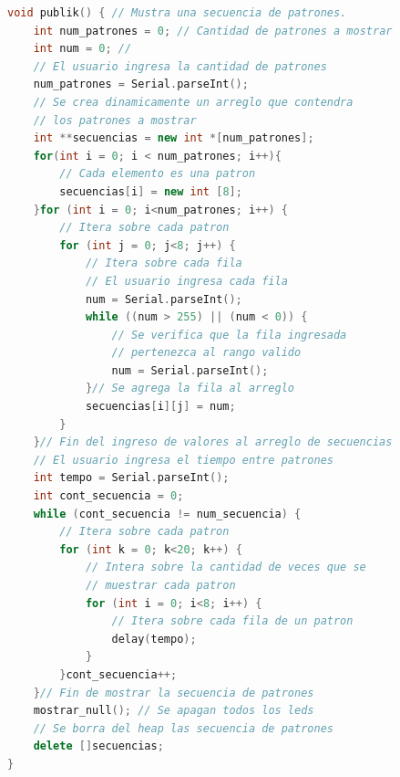 \documentclass{article}
\begin{document}
\begin{lstlisting}[language=C++, label=codigo_ejemplo]
void publik() { // Mustra una secuencia de patrones. 
    int num_patrones = 0; // Cantidad de patrones a mostrar
    int num = 0; // 
    // El usuario ingresa la cantidad de patrones
    num_patrones = Serial.parseInt();
    // Se crea dinamicamente un arreglo que contendra 
    // los patrones a mostrar
    int **secuencias = new int *[num_patrones];
    for(int i = 0; i < num_patrones; i++){
        // Cada elemento es una patron
        secuencias[i] = new int [8];
    }for (int i = 0; i<num_patrones; i++) {
        // Itera sobre cada patron
        for (int j = 0; j<8; j++) {
            // Itera sobre cada fila
            // El usuario ingresa cada fila 
            num = Serial.parseInt();
            while ((num > 255) || (num < 0)) {
                // Se verifica que la fila ingresada 
                // pertenezca al rango valido
                num = Serial.parseInt();
            }// Se agrega la fila al arreglo
            secuencias[i][j] = num;
        }
    }// Fin del ingreso de valores al arreglo de secuencias
    // El usuario ingresa el tiempo entre patrones
    int tempo = Serial.parseInt();
    int cont_secuencia = 0;
    while (cont_secuencia != num_secuencia) {
        // Itera sobre cada patron
        for (int k = 0; k<20; k++) {
            // Intera sobre la cantidad de veces que se 
            // muestrar cada patron 
            for (int i = 0; i<8; i++) {
                // Itera sobre cada fila de un patron
                delay(tempo);
            }
        }cont_secuencia++;
    }// Fin de mostrar la secuencia de patrones
    mostrar_null(); // Se apagan todos los leds
    // Se borra del heap las secuencia de patrones 
    delete []secuencias;
}


\end{lstlisting}
\end{document}
